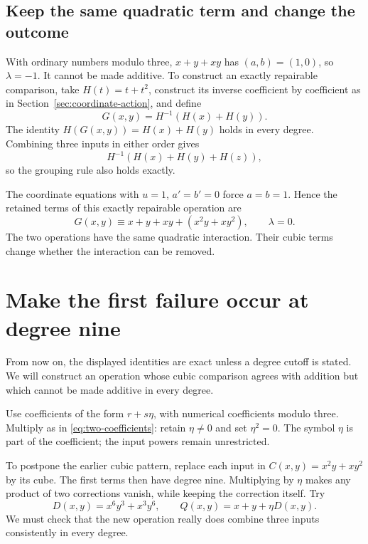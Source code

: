 \documentclass[11pt,letterpaper]{article}
\numberwithin{equation}{section}
\theoremstyle{definition}\newtheorem{example}[theorem]{Example}
\begin{document}
\subsection{Keep the same quadratic term and change the outcome}

With ordinary numbers modulo three, \(x+y+xy\) has \((a,b)=(1,0)\), so \(\lambda=-1\). It cannot be made additive. To construct an exactly repairable comparison, take \(H(t)=t+t^2\), construct its inverse coefficient by coefficient as in Section~\ref{sec:coordinate-action}, and define
\begin{equation}\label{eq:pullback-example}
 G(x,y)=H^{-1}(H(x)+H(y)).
\end{equation}
The identity \(H(G(x,y))=H(x)+H(y)\) holds in every degree. Combining three inputs in either order gives
\[
 H^{-1}(H(x)+H(y)+H(z)),
\]
so the grouping rule also holds exactly.

The coordinate equations with \(u=1\), \(a'=b'=0\) force \(a=b=1\). Hence the retained terms of this exactly repairable operation are
\[
 G(x,y)\equiv x+y+xy+(x^2y+xy^2),\qquad\lambda=0.
\]
The two operations have the same quadratic interaction. Their cubic terms change whether the interaction can be removed.

\section{Make the first failure occur at degree nine}\label{sec:later-obstruction}

From now on, the displayed identities are exact unless a degree cutoff is stated. We will construct an operation whose cubic comparison agrees with addition but which cannot be made additive in every degree.

Use coefficients of the form \(r+s\eta\), with numerical coefficients modulo three. Multiply as in \eqref{eq:two-coefficients}: retain \(\eta\ne0\) and set \(\eta^2=0\). The symbol \(\eta\) is part of the coefficient; the input powers remain unrestricted.

To postpone the earlier cubic pattern, replace each input in \(C(x,y)=x^2y+xy^2\) by its cube. The first terms then have degree nine. Multiplying by \(\eta\) makes any product of two corrections vanish, while keeping the correction itself. Try
\[
 D(x,y)=x^6y^3+x^3y^6,
 \qquad Q(x,y)=x+y+\eta D(x,y).
\]
We must check that the new operation really does combine three inputs consistently in every degree.
\end{document}
